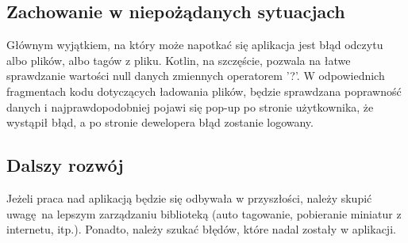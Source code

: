 \subsection{Zachowanie w niepożądanych sytuacjach}
Głównym wyjątkiem, na który może napotkać się aplikacja jest błąd odczytu albo plików, albo tagów z pliku. Kotlin, na szczęście, pozwala na łatwe sprawdzanie wartości null danych zmiennych operatorem '?'. W odpowiednich fragmentach kodu dotyczących ładowania plików, będzie sprawdzana poprawność danych i najprawdopodobniej pojawi się pop-up po stronie użytkownika, że wystąpił błąd, a po stronie dewelopera błąd zostanie logowany.
\subsection{Dalszy rozwój}
Jeżeli praca nad aplikacją będzie się odbywała w przyszłości, należy skupić uwagę na lepszym zarządzaniu biblioteką (auto tagowanie, pobieranie miniatur z internetu, itp.). Ponadto, należy szukać błędów, które nadal zostały w aplikacji.
